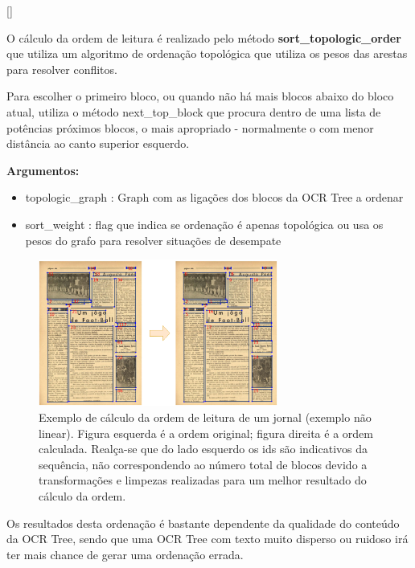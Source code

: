 [\normalsize]

O cálculo da ordem de leitura é realizado pelo método \textbf{sort\_topologic\_order} que utiliza um algoritmo de ordenação topológica que utiliza os pesos das arestas para resolver conflitos.

Para escolher o primeiro bloco, ou quando não há mais blocos abaixo do bloco atual, utiliza o método next\_top\_block que procura dentro de uma lista de potências próximos blocos, o mais apropriado - normalmente o com menor distância ao canto superior esquerdo. 

\textbf{Argumentos:}
\begin{itemize}\setlength\itemsep{-0.3em}
	\item topologic\_graph : Graph com as ligações dos blocos da OCR Tree a ordenar
	\item sort\_weight : flag que indica se ordenação é apenas topológica ou usa os pesos do grafo para resolver situações de desempate
\end{itemize}

\begin{figure}[H]
	\centering
	\includegraphics[width=0.7\textwidth]{images/ilustracoes/calculate_reading_order_example.png}
	\caption{Exemplo de cálculo da ordem de leitura de um jornal (exemplo não linear). Figura esquerda é a ordem original; figura direita é a ordem calculada. Realça-se que do lado esquerdo os ids são indicativos da sequência, não correspondendo ao número total de blocos devido a transformações e limpezas realizadas para um melhor resultado do cálculo da ordem.}
	\label{fig:calculate_reading_order_example_example}
\end{figure}


Os resultados desta ordenação é bastante dependente da qualidade do conteúdo da OCR Tree, sendo que uma OCR Tree com texto muito disperso ou ruidoso irá ter mais chance de  gerar uma ordenação errada. 

